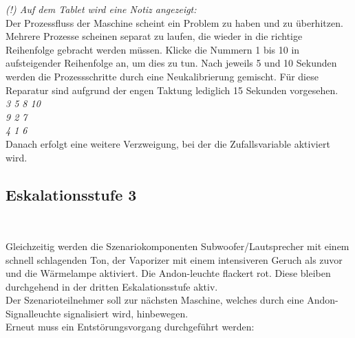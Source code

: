 {\emph{(!) Auf dem Tablet wird eine Notiz angezeigt:}\\

Der Prozessfluss der Maschine scheint ein Problem zu haben und zu überhitzen. Mehrere Prozesse scheinen separat zu laufen, die wieder in die richtige Reihenfolge gebracht werden müssen.
        Klicke die Nummern 1 bis 10 in aufsteigender Reihenfolge an, um dies zu tun.
        Nach jeweils 5 und 10 Sekunden werden die Prozessschritte durch eine Neukalibrierung gemischt.
        Für diese Reparatur sind aufgrund der engen Taktung lediglich 15 Sekunden vorgesehen. \\


\emph{3\hspace{15pt} 5\hspace{42pt} 8\hspace{58pt} 10\hspace{75pt} \\9\hspace{25pt} 2\hspace{37pt} 7\hspace{83pt} \\4\hspace{39pt} 1\hspace{66pt} 6\hspace{81pt}} \\

Danach erfolgt eine weitere Verzweigung, bei der die Zufallsvariable aktiviert wird. \\

\subsection*{Eskalationsstufe 3} \

Gleichzeitig werden die Szenariokomponenten Subwoofer/Lautsprecher mit einem schnell schlagenden Ton, der Vaporizer mit einem intensiveren Geruch als zuvor und die Wärmelampe aktiviert. Die Andon-leuchte flackert rot. Diese bleiben durchgehend in der dritten Eskalationsstufe aktiv.\hspace{0pt} \\
Der Szenarioteilnehmer soll zur nächsten Maschine, welches durch eine Andon-Signalleuchte signalisiert wird, hinbewegen.\hspace{0pt} \\
Erneut muss ein Entstörungsvorgang durchgeführt werden: \hspace{0pt}

}
